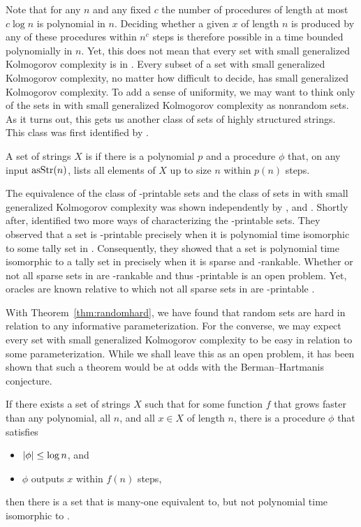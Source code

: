 Note that for any $n$ and any fixed $c$ the number of procedures of length at most $c\log n$ is polynomial in $n$.
Deciding whether a given $x$ of length $n$ is produced by any of these procedures within $n^c$ steps is therefore possible in a time bounded polynomially in $n$.
Yet, this does not mean that every set with small generalized Kolmogorov complexity is in .
Every subset of a set with small generalized Kolmogorov complexity, no matter how difficult to decide, has small generalized Kolmogorov complexity.
To add a sense of uniformity, we may want to think only of the sets in  with small generalized Kolmogorov complexity as nonrandom sets.
As it turns out, this gets us another class of sets of highly structured strings.
This class was first identified by \textcite{hartmanis1984computation}.
\begin{definition}
  A set of strings $X$ is  if there is a polynomial $p$ and a procedure $\phi$ that, on any input $\operatorname{asStr}(n)$, lists all elements of $X$ up to size $n$ within $p(n)$ steps.
\end{definition}

The equivalence of the class of \slp-printable sets and the class of sets in  with small generalized Kolmogorov complexity was shown independently by \textcite{balcazar1986sets}, and \textcite{rubinstein1986note}.
Shortly after, \textcite{allender1988p-printable} identified two more ways of characterizing the \slp-printable sets.
They observed that a set is \slp-printable precisely when it is polynomial time isomorphic to some tally set in .
Consequently, they showed that a set is polynomial time isomorphic to a tally set in  precisely when it is sparse and \slp-rankable.
Whether or not all sparse sets in  are \slp-rankable and thus \slp-printable is an open problem.
Yet, oracles are known relative to which not all sparse sets in  are \slp-printable \parencite{hartmanis1983generalized}.

With Theorem~\ref{thm:randomhard}, we have found that random sets are hard in relation to any informative parameterization.
For the converse, we may expect every set with small generalized Kolmogorov complexity to be easy in relation to some parameterization.
While we shall leave this as an open problem, it has been shown that such a theorem would be at odds with the Berman--Hartmanis conjecture.
\begin{theorem}
  If there exists a set of strings $X$ such that for some function $f$ that grows faster than any polynomial, all $n$, and all $x \in X$ of length $n$, there is a procedure $\phi$ that satisfies
  \begin{itemize}
  \item ${\lvert\phi\rvert} \le \log n$, and
  \item $\phi$ outputs $x$ within $f(n)$ steps,
  \end{itemize}
  then there is a set that is many-one equivalent to, but not polynomial time isomorphic to .
\end{theorem}
